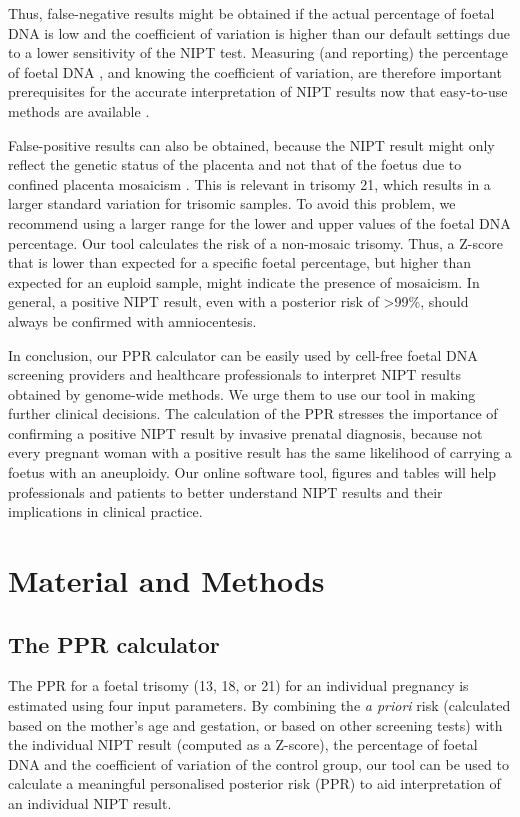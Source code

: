 Thus, false-negative results might be obtained if the actual percentage of foetal DNA is low and the coefficient of variation is higher than our default settings due to a lower sensitivity of the NIPT test. 
Measuring (and reporting) the percentage of foetal DNA \cite{Canick_2012}, and knowing the coefficient of variation, are therefore important prerequisites for the accurate interpretation of NIPT results \cite{Chiu_2008,Lau_2012} now that easy-to-use methods are available \cite{Straver_2016}.

False-positive results can also be obtained, because the NIPT result might only reflect the genetic status of the placenta and not that of the foetus due to confined placenta mosaicism \cite{Choi_2012,Wang_2013,Mao_2014}. 
This is relevant in trisomy 21, which results in a larger standard variation for trisomic samples. 
To avoid this problem, we recommend using a larger range for the lower and upper values of the foetal DNA percentage. 
Our tool calculates the risk of a non-mosaic trisomy. Thus, a Z-score that is lower than expected for a specific foetal percentage, but higher than expected for an euploid sample, might indicate the presence of mosaicism. 
In general, a positive NIPT result, even with a posterior risk of \textgreater99\%, should always be confirmed with amniocentesis.

In conclusion, our PPR calculator can be easily used by cell-free foetal DNA screening providers and healthcare professionals to interpret NIPT results obtained by genome-wide methods. 
We urge them to use our tool in making further clinical decisions. The calculation of the PPR stresses the importance of confirming a positive NIPT result by invasive prenatal diagnosis, because not every pregnant woman with a positive result has the same likelihood of carrying a foetus with an aneuploidy. 
Our online software tool, figures and tables will help professionals and patients to better understand NIPT results and their implications in clinical practice.

\section{Material and Methods}
\subsection{The PPR calculator}
The PPR for a foetal trisomy (13, 18, or 21) for an individual pregnancy is estimated using four input parameters. 
By combining the \textsl{a priori} risk (calculated based on the mother’s age and gestation, or based on other screening tests) with the individual NIPT result (computed as a Z-score), the percentage of foetal DNA and the coefficient of variation of the control group, our tool can be used to calculate a meaningful personalised posterior risk (PPR) to aid interpretation of an individual NIPT result.

